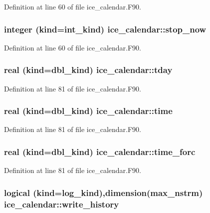 Definition at line 60 of file ice\_\-calendar.F90.\hypertarget{namespaceice__calendar_a7d6b1e515218c3fa92e328b9cf745b59}{
\subsubsection[{stop\_\-now}]{\setlength{\rightskip}{0pt plus 5cm}integer (kind=int\_\-kind) {\bf ice\_\-calendar::stop\_\-now}}}
\label{namespaceice__calendar_a7d6b1e515218c3fa92e328b9cf745b59}


Definition at line 60 of file ice\_\-calendar.F90.\hypertarget{namespaceice__calendar_a7a56bc05233c72a7b5176c7c2d6abe7c}{
\subsubsection[{tday}]{\setlength{\rightskip}{0pt plus 5cm}real (kind=dbl\_\-kind) {\bf ice\_\-calendar::tday}}}
\label{namespaceice__calendar_a7a56bc05233c72a7b5176c7c2d6abe7c}


Definition at line 81 of file ice\_\-calendar.F90.\hypertarget{namespaceice__calendar_a41fbc8dd30edf8e90070b7f5569fdd9b}{
\subsubsection[{time}]{\setlength{\rightskip}{0pt plus 5cm}real (kind=dbl\_\-kind) {\bf ice\_\-calendar::time}}}
\label{namespaceice__calendar_a41fbc8dd30edf8e90070b7f5569fdd9b}


Definition at line 81 of file ice\_\-calendar.F90.\hypertarget{namespaceice__calendar_abc4a1fb6d6f8356506f078c4265a6ce6}{
\subsubsection[{time\_\-forc}]{\setlength{\rightskip}{0pt plus 5cm}real (kind=dbl\_\-kind) {\bf ice\_\-calendar::time\_\-forc}}}
\label{namespaceice__calendar_abc4a1fb6d6f8356506f078c4265a6ce6}


Definition at line 81 of file ice\_\-calendar.F90.\hypertarget{namespaceice__calendar_a610c4039b3869befd73705569c033bef}{
\subsubsection[{write\_\-history}]{\setlength{\rightskip}{0pt plus 5cm}logical (kind=log\_\-kind),dimension(max\_\-nstrm) {\bf ice\_\-calendar::write\_\-history}}}
\label{namespaceice__calendar_a610c4039b3869befd73705569c033bef}



